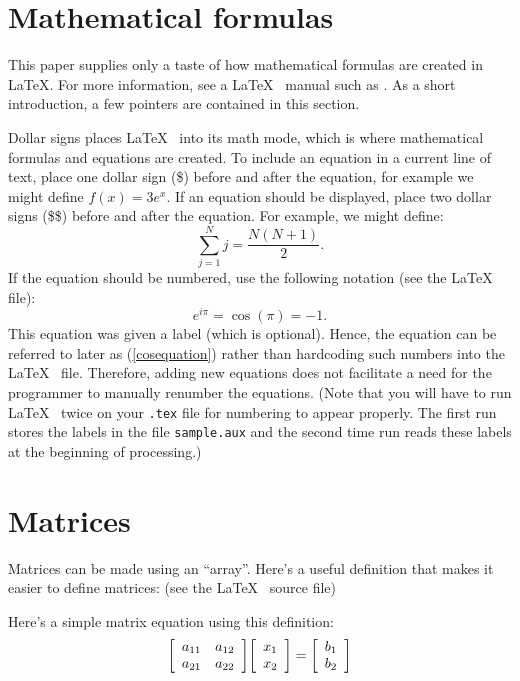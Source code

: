 \documentclass{article}
\begin{document}
	\section{Mathematical formulas}
	
	This paper supplies only a taste of how mathematical formulas are created in \LaTeX.  
	For more information, see a \LaTeX~ manual such as \cite{go-mi-sa:latex}.  
	As a short introduction, a few pointers are contained in this section. 
	
	Dollar signs places \LaTeX~ into its math mode, which is where mathematical formulas and equations
	are created.  To include an equation in a current line of text, place one dollar sign (\$) before 
	and after the equation, for example we might define $f(x) = 3e^x$.   If an equation should be displayed,
	place two dollar signs (\$\$) before and after the equation.  For example, we might define:
	$$
	\sum_{j=1}^N j = \frac{N(N+1)}{2}.
	$$
	If the equation should be numbered, use the following notation (see the \LaTeX~ file):
	\begin{equation}  
		e^{i\pi} = \cos(\pi) = -1.
		\label{cosequation}
	\end{equation}
	This equation was given a label (which is optional).  Hence, the equation
	can be referred to later as (\ref{cosequation}) rather than hardcoding such numbers into
	the \LaTeX~ file.  Therefore, adding new equations does not facilitate a need for the programmer 
	to manually renumber the equations. 
	(Note that you will have to run \LaTeX~ twice on your {\tt .tex}
	file for numbering to appear properly.  The first run stores the labels in
	the file {\tt sample.aux} and the second time run reads these labels at the
	beginning of processing.)
	
	\section{Matrices}
	
	Matrices can be made using an ``array''.  Here's a useful definition that 
	makes it easier to define matrices:  (see the \LaTeX~ source file)
	\newenvironment{mat}{\left[\begin{array}{ccccccccccccc}}{\end{array}\right]}
	
	Here's a simple matrix equation using this definition:
	\begin{equation}
		\begin{mat} a_{11} & a_{12} \\ a_{21} & a_{22} \end{mat}
		\begin{mat} x_1\\ x_2 \end{mat}
		= \begin{mat} b_1\\ b_2 \end{mat}
		\label{matrixequation}
	\end{equation}
	
\end{document}
